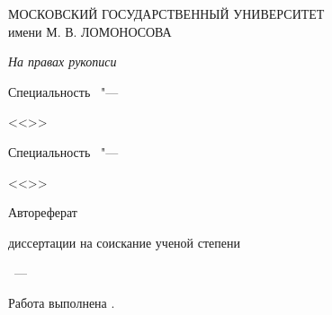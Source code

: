 \thispagestyle{empty}

\begin{center}
МОСКОВСКИЙ ГОСУДАРСТВЕННЫЙ УНИВЕРСИТЕТ\\
имени М. В. ЛОМОНОСОВА
\end{center}

\vspace{0pt plus1.5fill}

\begin{flushright}
\large{\textit{На правах рукописи}}
\end{flushright}

\vspace{0pt plus1fill} %
\begin{center}
\textbf {\large \thesisAuthor}
\end{center}

\vspace{0pt plus3fill} %
\begin{center}
\textbf {\large %
\thesisTitle}

\vspace{0pt plus3fill} %
{\large Специальность \thesisSpecialtyNumber\ "---\par <<\thesisSpecialtyTitle>>}

\ifdefined\thesisSpecialtyTwoNumber
{\large Специальность \thesisSpecialtyTwoNumber\ "---\par <<\thesisSpecialtyTwoTitle>>}
\fi

\vspace{0pt plus1.5fill} %
\Large{Автореферат}\par
\large{диссертации на соискание ученой степени\par \thesisDegree}
\end{center}

\vspace{0pt plus4fill} %
{\centering\thesisCity~--- \thesisYear\par}

\newpage
\thispagestyle{empty}
\noindent Работа выполнена {\thesisInOrganization}.

